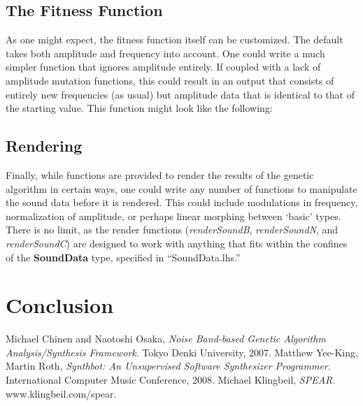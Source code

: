 \documentclass[11pt]{article}
\begin{document}
\subsection{The Fitness Function}
As one might expect, the fitness function itself can be customized. The default takes both amplitude and frequency into account. One could write a much simpler function that ignores amplitude entirely. If coupled with a lack of amplitude mutation functions, this could result in an output that consists of entirely new frequencies (as usual) but amplitude data that is identical to that of the starting value. This function might look like the following:

\subsection{Rendering}
Finally, while functions are provided to render the results of the genetic algorithm in certain ways, one could write any number of functions to manipulate the sound data before it is rendered. This could include modulations in frequency, normalization of amplitude, or perhaps linear morphing between `basic' types. There is no limit, as the render functions (\emph{renderSoundB}, \emph{renderSoundN}, and \emph{renderSoundC}) are designed to work with anything that fits within the confines of the {\bf SoundData} type, specified in ``SoundData.lhs.''

\section{Conclusion}


\begin{thebibliography}{2}

	  Michael Chinen and Naotoshi Osaka,
	  \emph{Noise Band-based Genetic Algorithm Analysis/Synthesis Framework}.
	  Tokyo Denki University,
	  2007.
	  Matthew Yee-King, Martin Roth,
	  \emph{Synthbot: An Unsupervised Software Synthesizer Programmer}.
	  International Computer Music Conference,
	  2008.
	  Michael Klingbeil,
	  \emph{SPEAR}.
	  www.klingbeil.com/spear.
\end{thebibliography}
\end{document}

